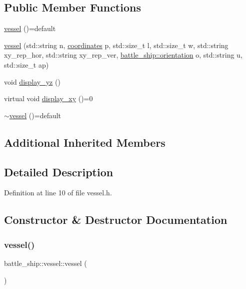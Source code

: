 \subsection*{Public Member Functions}
\begin{DoxyCompactItemize}
\item 
\hyperlink{classbattle__ship_1_1vessel_a6f3be9c2343940c262fb7add97402311}{vessel} ()=default
\item 
\hyperlink{classbattle__ship_1_1vessel_af7546f657ff5bf1daf683d30db034a4f}{vessel} (std\+::string n, \hyperlink{structbattle__ship_1_1coordinates}{coordinates} p, std\+::size\+\_\+t l, std\+::size\+\_\+t w, std\+::string xy\+\_\+rep\+\_\+hor, std\+::string xy\+\_\+rep\+\_\+ver, \hyperlink{namespacebattle__ship_aed87488f0a73f0d0679fe343fb61c784}{battle\+\_\+ship\+::orientation} o, std\+::string u, std\+::size\+\_\+t ap)
\item 
void \hyperlink{classbattle__ship_1_1vessel_ad573c7ceefb8a2ec34e353d57468d4f2}{display\+\_\+yz} ()
\item 
virtual void \hyperlink{classbattle__ship_1_1vessel_a9e72e4a65466cbfe4c550d3741dbe824}{display\+\_\+xy} ()=0
\item 
\hyperlink{classbattle__ship_1_1vessel_a281821b204a7fb93071ef75de5685a37}{$\sim$vessel} ()=default
\end{DoxyCompactItemize}
\subsection*{Additional Inherited Members}


\subsection{Detailed Description}


Definition at line 10 of file vessel.\+h.



\subsection{Constructor \& Destructor Documentation}
\mbox{\label{classbattle__ship_1_1vessel_a6f3be9c2343940c262fb7add97402311}} 
\subsubsection{\texorpdfstring{vessel()}{vessel()}\hspace{0.1cm}{\footnotesize\ttfamily [1/2]}}
{\footnotesize\ttfamily battle\+\_\+ship\+::vessel\+::vessel (\begin{DoxyParamCaption}{ }\end{DoxyParamCaption})\hspace{0.3cm}{\ttfamily [default]}}

